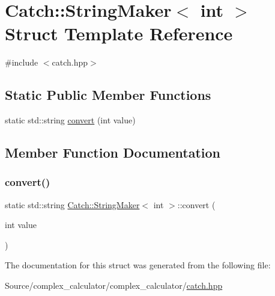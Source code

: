 \hypertarget{struct_catch_1_1_string_maker_3_01int_01_4}{}\section{Catch\+:\+:String\+Maker$<$ int $>$ Struct Template Reference}
\label{struct_catch_1_1_string_maker_3_01int_01_4}


{\ttfamily \#include $<$catch.\+hpp$>$}

\subsection*{Static Public Member Functions}
\begin{DoxyCompactItemize}
\item 
static std\+::string \mbox{\hyperlink{struct_catch_1_1_string_maker_3_01int_01_4_aab096e55fb7283f6ad47b5ca277e22e8}{convert}} (int value)
\end{DoxyCompactItemize}


\subsection{Member Function Documentation}
\mbox{\label{struct_catch_1_1_string_maker_3_01int_01_4_aab096e55fb7283f6ad47b5ca277e22e8}} 
\subsubsection{\texorpdfstring{convert()}{convert()}}
{\footnotesize\ttfamily static std\+::string \mbox{\hyperlink{struct_catch_1_1_string_maker}{Catch\+::\+String\+Maker}}$<$ int $>$\+::convert (\begin{DoxyParamCaption}\item[{int}]{value }\end{DoxyParamCaption})\hspace{0.3cm}{\ttfamily [static]}}



The documentation for this struct was generated from the following file\+:\begin{DoxyCompactItemize}
\item 
Source/complex\+\_\+calculator/complex\+\_\+calculator/\mbox{\hyperlink{catch_8hpp}{catch.\+hpp}}\end{DoxyCompactItemize}
